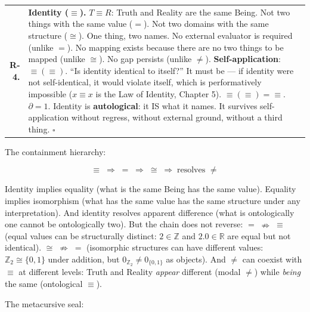 \documentclass[10pt, openany, oneside]{book}
\begin{document}
{\begin{tabular}{r p{}}
\textbf{R-4.} & \textbf{Identity ($\equiv$).} $T \equiv R$: Truth and Reality are the same Being. Not two things with the same value ($=$). Not two domains with the same structure ($\cong$). One thing, two names. No external evaluator is required (unlike $=$). No mapping exists because there are no two things to be mapped (unlike $\cong$). No gap persists (unlike $\neq$). \textbf{Self-application}: $\equiv(\equiv)$. ``Is identity identical to itself?'' It must be --- if identity were not self-identical, it would violate itself, which is performatively impossible ($x \equiv x$ is the Law of Identity, Chapter 5). $\equiv(\equiv) = \equiv$. $\partial = 1$. Identity is \textbf{autological}: it IS what it names. It survives self-application without regress, without external ground, without a third thing. $\square$ \\[0.3em]
\end{tabular}
}

\vspace{0.8em}

\noindent The containment hierarchy:

$$\equiv \;\Rightarrow\; = \;\Rightarrow\; \cong \;\Rightarrow\; \text{resolves } \neq$$

Identity implies equality (what is the same Being has the same value). Equality implies isomorphism (what has the same value has the same structure under any interpretation). And identity resolves apparent difference (what is ontologically one cannot be ontologically two). But the chain does not reverse: $= \;\nRightarrow\; \equiv$ (equal values can be structurally distinct: $2 \in \mathbb{Z}$ and $2.0 \in \mathbb{R}$ are equal but not identical). $\cong \;\nRightarrow\; =$ (isomorphic structures can have different values: $\mathbb{Z}_2 \cong \{0,1\}$ under addition, but $0_{\mathbb{Z}_2} \neq 0_{\{0,1\}}$ as objects). And $\neq$ can coexist with $\equiv$ at different levels: Truth and Reality \textit{appear} different (modal $\neq$) while \textit{being} the same (ontological $\equiv$).

\vspace{0.5em}

The metacursive seal:

\vspace{0.5em}
\end{document}
